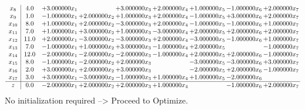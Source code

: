 \documentclass[10pt]{article}
\begin{document}
\[\begin{array}{c| c c@{\hskip 2pt} c@{\hskip 2pt} c@{\hskip 2pt} c@{\hskip 2pt} c@{\hskip 2pt} c@{\hskip 2pt} c@{\hskip 2pt} }
 x_{8}   &  4.0 & + 3.000000 x_{1} &   & + 3.000000 x_{3} & + 2.000000 x_{4} & + 1.000000 x_{5} & -1.000000 x_{6} & + 2.000000 x_{7}\\
 x_{9}   &  1.0 & -1.000000 x_{1} & + 2.000000 x_{2} & + 1.000000 x_{3} & + 2.000000 x_{4} & -1.000000 x_{5} & + 3.000000 x_{6} & + 2.000000 x_{7}\\
 x_{10}   &  8.0 & + 1.000000 x_{1} & + 2.000000 x_{2} & -3.000000 x_{3} & + 2.000000 x_{4} & -1.000000 x_{5} & -1.000000 x_{6} & + 1.000000 x_{7}\\
 x_{11}   &  7.0 & + 1.000000 x_{1} & + 3.000000 x_{2} & + 1.000000 x_{3} & -3.000000 x_{4} & + 2.000000 x_{5} & + 2.000000 x_{6} & + 2.000000 x_{7}\\
 x_{12}   &  11.0 & + 2.000000 x_{1} & -3.000000 x_{2} & -3.000000 x_{3} & + 2.000000 x_{4} & -3.000000 x_{5} & -1.000000 x_{6} & + 1.000000 x_{7}\\
 x_{13}   &  7.0 & -1.000000 x_{1} & + 1.000000 x_{2} & + 3.000000 x_{3} & -1.000000 x_{4} & + 2.000000 x_{5} &   & -1.000000 x_{7}\\
 x_{14}   &  12.0 & -2.000000 x_{1} & -2.000000 x_{2} & -2.000000 x_{3} & -1.000000 x_{4} & + 2.000000 x_{5} & + 2.000000 x_{6} & -1.000000 x_{7}\\
 x_{15}   &  8.0 & -1.000000 x_{1} & -2.000000 x_{2} & + 2.000000 x_{3} &   & -3.000000 x_{5} & -3.000000 x_{6} & + 3.000000 x_{7}\\
 x_{16}   &  2.0 & + 3.000000 x_{1} & + 2.000000 x_{2} & + 3.000000 x_{3} &   & -2.000000 x_{5} & + 2.000000 x_{6} & -1.000000 x_{7}\\
 x_{17}   &  3.0 & + 3.000000 x_{1} & -3.000000 x_{2} & -1.000000 x_{3} & + 1.000000 x_{4} & + 1.000000 x_{5} & -2.000000 x_{6} &   \\
\hline
z    &  0.0 & -2.000000 x_{1} & + 2.000000 x_{2} & + 2.000000 x_{3} & + 1.000000 x_{4} &   & -1.000000 x_{6} & + 2.000000 x_{7}\\
\end{array}\]
No initialization required --> Proceed to Optimize. 
\end{document}
